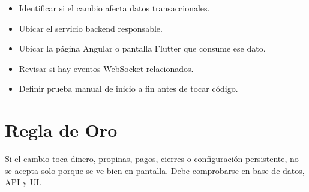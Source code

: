 \documentclass[11pt,letterpaper,openany]{report}
\begin{document}
\begin{itemize}[leftmargin=*]
  \item Identificar si el cambio afecta datos transaccionales.
  \item Ubicar el servicio backend responsable.
  \item Ubicar la página Angular o pantalla Flutter que consume ese dato.
  \item Revisar si hay eventos WebSocket relacionados.
  \item Definir prueba manual de inicio a fin antes de tocar código.
\end{itemize}

\section{Regla de Oro}

Si el cambio toca dinero, propinas, pagos, cierres o configuración persistente, no se acepta solo porque se ve bien en pantalla. Debe comprobarse en base de datos, API y UI.
\end{document}
